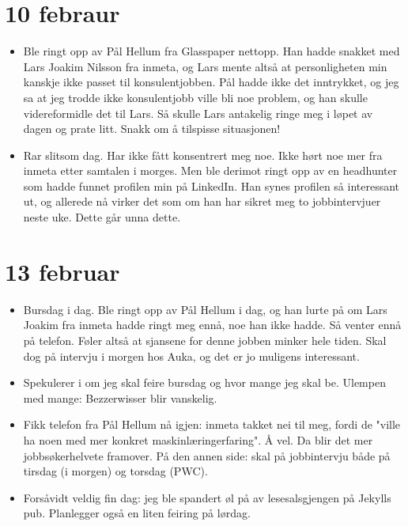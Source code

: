 \documentclass[11pt, norsk]{article}
\begin{document}
\section{10 febraur} %
\label{sec:10_febraur}

\begin{itemize}
  \item Ble ringt opp av Pål Hellum fra Glasspaper nettopp. Han hadde snakket med Lars Joakim Nilsson fra inmeta, og Lars mente altså at personligheten min kanskje ikke passet til konsulentjobben. Pål hadde ikke det inntrykket, og jeg sa at jeg trodde ikke konsulentjobb ville bli noe problem, og han skulle videreformidle det til Lars. Så skulle Lars antakelig ringe meg i løpet av dagen og prate litt. Snakk om å tilspisse situasjonen!
  \item Rar slitsom dag. Har ikke fått konsentrert meg noe. Ikke hørt noe mer fra inmeta etter samtalen i morges. Men ble derimot ringt opp av en headhunter som hadde funnet profilen min på LinkedIn. Han synes profilen så interessant ut, og allerede nå virker det som om han har sikret meg to jobbintervjuer neste uke. Dette går unna dette. 
\end{itemize}


\section{13 februar} %
\label{sec:13_februar}

\begin{itemize}
  \item Bursdag i dag. Ble ringt opp av Pål Hellum i dag, og han lurte på om Lars Joakim fra inmeta hadde ringt meg ennå, noe han ikke hadde. Så venter ennå på telefon. Føler altså at sjansene for denne jobben minker hele tiden. Skal dog på intervju i morgen hos Auka, og det er jo muligens interessant.
  \item Spekulerer i om jeg skal feire bursdag og hvor mange jeg skal be. Ulempen med mange: Bezzerwisser blir vanskelig.
  \item Fikk telefon fra Pål Hellum nå igjen: inmeta takket nei til meg, fordi de "ville ha noen med mer konkret maskinlæringerfaring". Å vel. Da blir det mer jobbsøkerhelvete framover. På den annen side: skal på jobbintervju både på tirsdag (i morgen) og torsdag (PWC).
  \item Forsåvidt veldig fin dag: jeg ble spandert øl på av lesesalsgjengen på Jekylls pub. Planlegger også en liten feiring på lørdag. 
\end{itemize}
\end{document}
